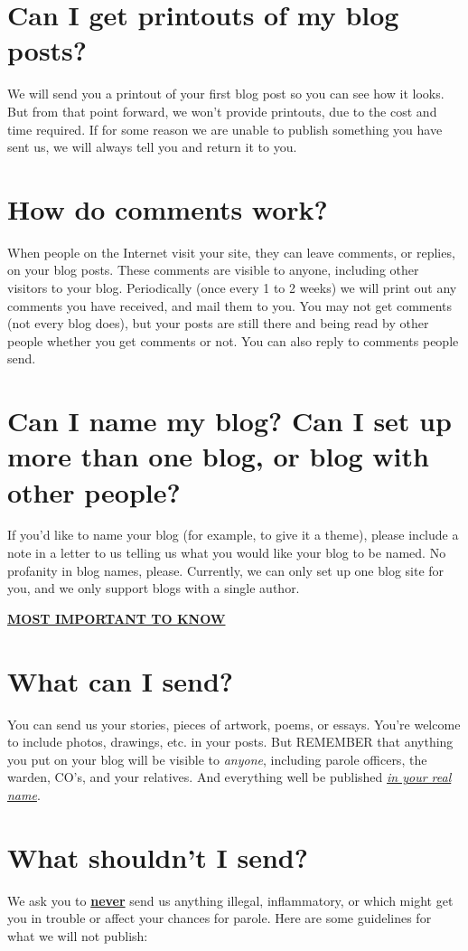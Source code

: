 \documentclass[12pt]{article}
\begin{document}
{{\section*{Can I get printouts of my blog posts?}
We will send you a printout of your first blog post so you can see how it looks.  But from that point forward, we won't provide printouts, due to the cost and time required.  If for some reason we are unable to publish something you have sent us, we will always tell you and return it to you.

\section*{How do comments work?}
When people on the Internet visit your site, they can leave comments, or replies, on your blog posts.  These comments are visible to anyone, including other visitors to your blog.  Periodically (once every 1 to 2 weeks) we will print out any comments you have received, and mail them to you.  You may not get comments (not every blog does), but your posts are still there and being read by other people whether you get comments or not.  You can also reply to comments people send.

\section*{Can I name my blog?  Can I set up more than one blog, or blog with other people?}
If you'd like to name your blog (for example, to give it a theme), please include a note in a  letter to us telling us what you would like your blog to be named.  No profanity in blog names, please.  Currently, we can only set up one blog site for you, and we only support blogs with a single author.

\pagebreak
\centerline{ {\bf \underline{ MOST IMPORTANT TO KNOW }}}

\section*{What can I send?}
You can send us your stories, pieces of artwork, poems, or essays.  You're welcome to include photos, drawings, etc. in your posts.  But REMEMBER that anything you put on your blog will be visible to \emph{anyone}, including parole officers, the warden, CO's, and your relatives.  And everything well be published \emph{\underline{in your real name}}.

\section*{What shouldn't I send?}
We ask you to {\bf \underline{never}} send us anything illegal, inflammatory, or which might get you in trouble or affect your chances for parole.  Here are some guidelines for what we will not publish:

}}
\end{document}
